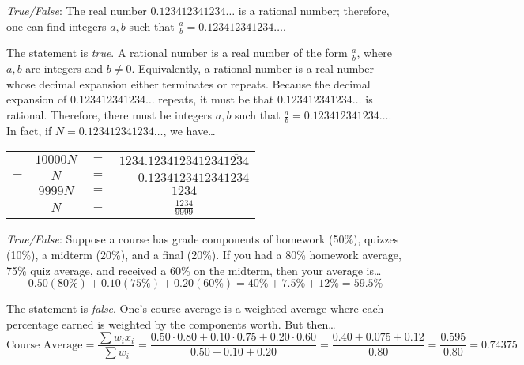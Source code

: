 \documentclass[11pt,letterpaper]{article}
\begin{document}
\newpage



\quizsol \textit{True/False}: The real number $0.123412341234\ldots$ is a rational number; therefore, one can find integers $a, b$ such that $\frac{a}{b}= 0.123412341234\ldots$. \pspace

\sol The statement is \textit{true}. A rational number is a real number of the form $\frac{a}{b}$, where $a, b$ are integers and $b \neq 0$. Equivalently, a rational number is a real number whose decimal expansion either terminates or repeats. Because the decimal expansion of $0.123412341234\ldots$ repeats, it must be that $0.123412341234\ldots$ is rational. Therefore, there must be integers $a, b$ such that $\frac{a}{b}= 0.123412341234\dots$. In fact, if $N= 0.123412341234\dots$, we have\ldots
	\begin{table}[!ht]
	\centering\small
	\begin{tabular}{rccc}
	& $10000N$ & $=$ & $1234.123412341234\overline{1234}$ \\ 
	$-$ & $N$ & $=$ & $\phantom{123}0.123412341234\overline{1234}$ \\ \hline
	& $9999N$ & $=$ & $1234$ \\[0.1cm]
	& $N$ & $=$ & $\frac{1234}{9999}$
	\end{tabular}
	\end{table} \pvspace{1.3cm}



\quizsol \textit{True/False}: Suppose a course has grade components of homework (50\%), quizzes (10\%), a midterm (20\%), and a final (20\%). If you had a 80\% homework average, 75\% quiz average, and received a 60\% on the midterm, then your average is\dots
	\[
	0.50(80\%) + 0.10(75\%) + 0.20(60\%)= 40\% + 7.5\% + 12\%= 59.5\%
	\] \pspace

\sol The statement is \textit{false}. One's course average is a weighted average where each percentage earned is weighted by the components worth. But then\dots
	\[
	\text{Course Average}= \dfrac{\sum w_i x_i}{\sum w_i}= \dfrac{0.50 \cdot 0.80 + 0.10 \cdot 0.75 + 0.20 \cdot 0.60}{0.50 + 0.10 + 0.20}= \dfrac{0.40 + 0.075 + 0.12}{0.80}= \dfrac{0.595}{0.80}= 0.74375
	\] \pvspace{1.3cm}
\end{document}
